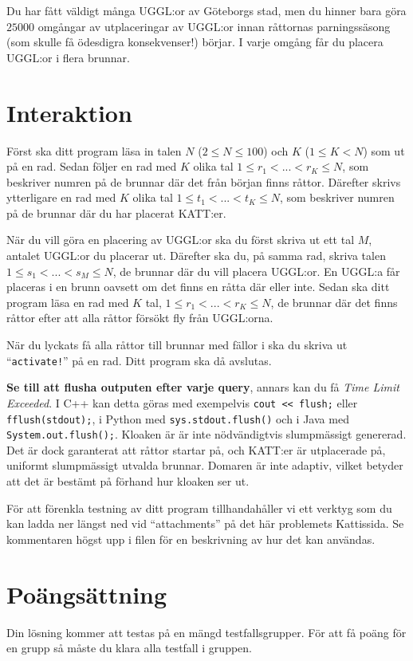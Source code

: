 Du har fått väldigt många UGGL:or av Göteborgs stad, men du hinner bara göra $25000$ omgångar av utplaceringar av UGGL:or innan 
råttornas parningssäsong (som skulle få ödesdigra konsekvenser!) börjar. I varje omgång får du placera UGGL:or i flera brunnar.


\section*{Interaktion}
Först ska ditt program läsa in talen $N$ ($2 \leq N \leq 100$) och $K$ ($1 \leq K < N$) som ut på en rad.
Sedan följer en rad med $K$ olika tal $1 \leq r_1 < ... < r_K \leq N$, som beskriver numren på de brunnar där det från början finns råttor.
Därefter skrivs ytterligare en rad med $K$ olika tal $1 \leq t_1 < ... < t_K \leq N$, som beskriver numren på de brunnar där du har placerat KATT:er.

När du vill göra en placering av UGGL:or ska du först skriva ut ett tal $M$, antalet UGGL:or du placerar ut. 
Därefter ska du, på samma rad, skriva talen $1 \leq s_1 < ... < s_M \leq N$,
de brunnar där du vill placera UGGL:or. En UGGL:a får placeras i en brunn oavsett om det finns en råtta där eller inte.
Sedan ska ditt program läsa en rad med $K$ tal, $1 \leq r_1 < ... < r_K \leq N$, 
de brunnar där det finns råttor efter att alla råttor försökt fly från UGGL:orna.

När du lyckats få alla råttor till brunnar med fällor i ska du skriva ut ``\texttt{activate!}'' på en rad. 
Ditt program ska då avslutas.

\textbf{Se till att flusha outputen efter varje query}, annars kan du få \textit{Time Limit Exceeded}.
I C++ kan detta göras med exempelvis \texttt{cout << flush;}
eller \texttt{fflush(stdout);},
i Python med \texttt{sys.stdout.flush()}
och i Java med \texttt{System.out.flush();}.
Kloaken är är inte nödvändigtvis slumpmässigt genererad. 
Det är dock garanterat att råttor startar på, och KATT:er är utplacerade på, uniformt slumpmässigt utvalda brunnar. 
Domaren är inte adaptiv, vilket betyder att det är bestämt på förhand hur kloaken ser ut.

För att förenkla testning av ditt program tillhandahåller vi ett verktyg som du kan ladda ner längst ned
vid ``attachments'' på det här problemets Kattissida. Se kommentaren högst upp i filen för en beskrivning av hur det kan användas.

\section*{Poängsättning}
Din lösning kommer att testas på en mängd testfallsgrupper.
För att få poäng för en grupp så måste du klara alla testfall i gruppen.

